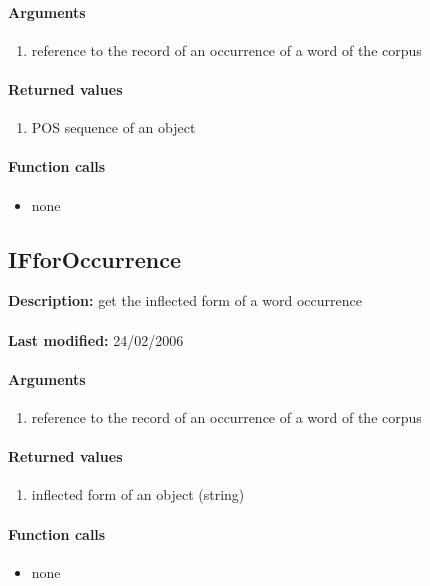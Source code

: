 \paragraph{Arguments}
\begin{enumerate}
\item reference to the record of an occurrence of a word of the corpus
\end{enumerate}

\paragraph{Returned values}
\begin{enumerate}
\item POS sequence of an object
\end{enumerate}

\paragraph{Function calls}
\begin{itemize}
\item none
\end{itemize}

\subsection{IFforOccurrence}
\textbf{Description:} get the inflected form of a word occurrence\\
\\\textbf{Last modified:} 24/02/2006

\paragraph{Arguments}
\begin{enumerate}
\item reference to the record of an occurrence of a word of the corpus
\end{enumerate}

\paragraph{Returned values}
\begin{enumerate}
\item inflected form of an object (string)
\end{enumerate}

\paragraph{Function calls}
\begin{itemize}
\item none
\end{itemize}

